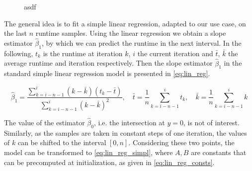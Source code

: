 \begin{figure}[htpb]
	\centering
	\caption{asdf}
	\label{fig:split_vs_regression}
\end{figure}




The general idea is to fit a simple linear regression, adapted to our use case, on the last $n$ runtime samples. Using the linear regression we obtain a slope estimator $\hat{\beta}_1$, by which we can predict the runtime in the next interval. In the following, $t_k$ is the runtime at iteration $k$, $i$ the current iteration and $\bar t$, $\bar k$ the average runtime and iteration respectively. Then the slope estimator $\hat{\beta}_1$ in the standard simple linear regression model is presented in \eqref{eq:lin_reg}.


\begin{equation}
	\hat{\beta}_1=\frac{\sum_{k=i-n-1}^{i}(k-\bar k)(t_k-\bar t)}{\sum_{k=i-n-1}^{i}(k-\bar k)^2},\quad\bar t=\frac{1}{n}\sum_{k=i-n-1}^it_k, \quad \bar k = \frac{1}{n}\sum_{k=i-n-1}^ik\label{eq:lin_reg}
\end{equation}

The value of the estimator $\hat\beta_0$, i.e. the intersection at $y=0$, is not of interest. Similarly, as the samples are taken in constant steps of one iteration, the values of $k$ can be shifted to the interval $[0, n]$. Considering these two points, the model can be transformed to \eqref{eq:lin_reg_simpl}, where $A, B$ are constants that can be precomputed at initialization, as given in \eqref{eq:lin_reg_consts}.

